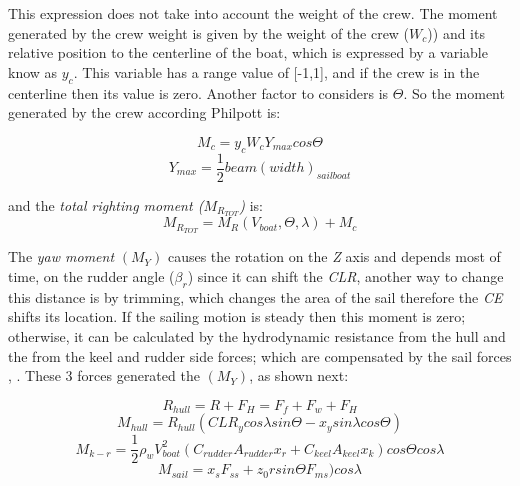 This expression does not take into account the weight of the crew. The moment generated by the crew weight is given by the weight of the crew (\textit{$W_{c}$})) and its relative position to the centerline of the boat, which is expressed by a variable know as \textit{$y_{c}$}. This variable has a range value of [-1,1], and if the crew is in the centerline then its value is zero. Another factor to considers is $\Theta$. So the moment generated by the crew according Philpott \cite{philpott1993yacht} is: \par 
\begin{equation}\label{eq:Moment_crew}
    M_{c} = y_{c} W_{c} Y_{max} cos \Theta
\end{equation} 
\begin{equation} \label{eq:Mcrew_dist}
    Y_{max} = \frac{1}{2} beam(width)_{sailboat}
\end{equation}

and the \textit{total righting moment ($M_{R_{TOT}}$)} is:
\begin{equation} \label{eq:Mr_tot}
    M_{R_{TOT}}=M_{R}(V_{boat}, \Theta, \lambda) + M_{c}
\end{equation}

The \textit{yaw moment} $(M_{Y})$ causes the rotation on the \textit{Z} axis and depends most of time, on the rudder angle (\textit{$\beta_{r}$}) since it can shift the \textit{CLR}, another way to change this distance is by trimming, which changes the area of the sail therefore the \textit{CE} shifts its location. If the sailing motion is steady then this moment is zero; otherwise, it can be calculated by the hydrodynamic resistance from the hull and the from the keel and rudder side forces; which are compensated by the sail forces \cite{philpott1993yacht}, \cite{claughton1998sailing}. These 3 forces generated the $(M_{Y})$, as shown next: \par
\begin{equation}\label{eq:Hull_R}
    R_{hull}=R+F_{H}=F_{f}+F_{w}+F_{H}
\end{equation}
\begin{equation}\label{eq:hull_moment}
   M_{hull}=R_{hull}(CLR_{y} cos \lambda sin \Theta - x_{y} sin \lambda cos \Theta) 
\end{equation}
\begin{equation}\label{eq:keel-rudder_moment}
   M_{k-r}=\frac{1}{2}\rho_{w} V_{boat}^2(C_{rudder}A_{rudder}x_{r}+C_{keel}A_{keel}x_{k})cos \Theta cos \lambda
\end{equation}
\begin{equation}\label{eq:sail_moment}
    M_{sail}=x_{s}F_{ss}+z_{0}r sin \Theta F_{ms}) cos \lambda
\end{equation}

